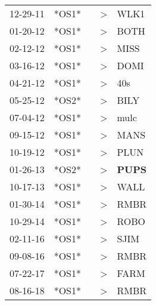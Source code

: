 \begin{supertabular}{p{0.07\textwidth}p{0.06\textwidth}p{0.02\textwidth}p{0.02\textwidth}p{0.06\textwidth}}
 12-29-11\textsuperscript{} &  *OS1* &   &  \textgreater &           WLK1\textsuperscript{} \\
 01-20-12\textsuperscript{} &  *OS1* &   &  \textgreater &           BOTH\textsuperscript{} \\
 02-12-12\textsuperscript{} &  *OS1* &   &  \textgreater &           MISS\textsuperscript{} \\
 03-16-12\textsuperscript{} &  *OS1* &   &  \textgreater &           DOMI\textsuperscript{} \\
 04-21-12\textsuperscript{} &  *OS1* &   &  \textgreater &            40s\textsuperscript{} \\
 05-25-12\textsuperscript{} &  *OS2* &   &  \textgreater &           BILY\textsuperscript{} \\
 07-04-12\textsuperscript{} &  *OS1* &   &  \textgreater &           mulc\textsuperscript{} \\
 09-15-12\textsuperscript{} &  *OS1* &   &  \textgreater &           MANS\textsuperscript{} \\
 10-19-12\textsuperscript{} &  *OS1* &   &  \textgreater &           PLUN\textsuperscript{} \\
 01-26-13\textsuperscript{} &  *OS2* &   &  \textgreater &  \textbf{PUPS\textsuperscript{}} \\
 10-17-13\textsuperscript{} &  *OS1* &   &  \textgreater &           WALL\textsuperscript{} \\
 01-30-14\textsuperscript{} &  *OS1* &   &  \textgreater &           RMBR\textsuperscript{} \\
 10-29-14\textsuperscript{} &  *OS1* &   &  \textgreater &           ROBO\textsuperscript{} \\
 02-11-16\textsuperscript{} &  *OS1* &   &  \textgreater &           SJIM\textsuperscript{} \\
 09-08-16\textsuperscript{} &  *OS1* &   &  \textgreater &           RMBR\textsuperscript{} \\
 07-22-17\textsuperscript{} &  *OS1* &   &  \textgreater &           FARM\textsuperscript{} \\
 08-16-18\textsuperscript{} &  *OS1* &   &  \textgreater &           RMBR\textsuperscript{} \\
\end{supertabular}
